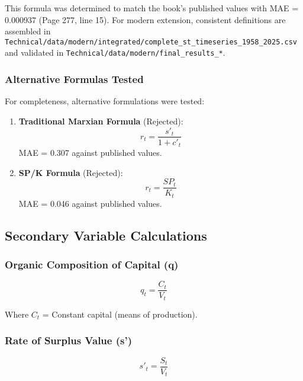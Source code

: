 \documentclass[12pt,a4paper]{article}
\begin{document}
This formula was determined to match the book's published values with MAE = 0.000937 (Page 277, line 15). For modern extension, consistent definitions are assembled in \texttt{Technical/data/modern/integrated/complete\_st\_timeseries\_1958\_2025.csv} and validated in \texttt{Technical/data/modern/final\_results\_*}.

\subsubsection{Alternative Formulas Tested}
For completeness, alternative formulations were tested:

\begin{enumerate}
    \item \textbf{Traditional Marxian Formula} (Rejected):
    \begin{equation}
    r_t = \frac{s'_t}{1 + c'_t}
    \label{eq:traditional_profit}
    \end{equation}
    MAE = 0.307 against published values.

    \item \textbf{SP/K Formula} (Rejected):
    \begin{equation}
    r_t = \frac{SP_t}{K_t}
    \label{eq:sp_over_k}
    \end{equation}
    MAE = 0.046 against published values.
\end{enumerate}

\subsection{Secondary Variable Calculations}

\subsubsection{Organic Composition of Capital (q)}
\begin{equation}
q_t = \frac{C_t}{V_t}
\label{eq:organic_composition}
\end{equation}

Where $C_t$ = Constant capital (means of production).

\subsubsection{Rate of Surplus Value (s')}
\begin{equation}
s'_t = \frac{S_t}{V_t}
\label{eq:surplus_value_rate}
\end{equation}
\end{document}
